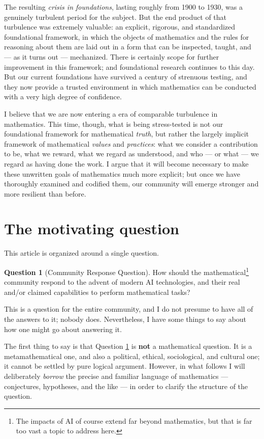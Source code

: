 \documentclass[12pt]{amsart}
\theoremstyle{definition}
\newtheorem{question}{Question}[section]
\begin{document}
The resulting \emph{crisis in foundations}, lasting roughly from 1900 to 1930, was a genuinely turbulent period for the subject.  But the end product of that turbulence was extremely valuable: an explicit, rigorous, and standardized foundational framework, in which the objects of mathematics and the rules for reasoning about them are laid out in a form that can be inspected, taught, and --- as it turns out --- mechanized.  There is certainly scope for further improvement in this framework; and foundational research continues to this day.  But our current foundations have survived a century of strenuous testing, and they now provide a trusted environment in which mathematics can be conducted with a very high degree of confidence.

I believe that we are now entering a era of comparable turbulence in mathematics.  This time, though, what is being stress-tested is not our foundational framework for mathematical \emph{truth}, but rather the largely implicit framework of mathematical \emph{values} and \emph{practices}: what we consider a contribution to be, what we reward, what we regard as understood, and who --- or what --- we regard as having done the work.  I argue that it will become necessary to make these unwritten goals of mathematics much more explicit; but once we have thoroughly examined and codified them, our community will emerge stronger and more resilient than before.

\section{The motivating question}

This article is organized around a single question.

\begin{question}[Community Response Question]\label{crq} How should the mathematical\footnote{The impacts of AI of course extend far beyond mathematics, but that is far too vast a topic to address here.} community respond to the advent of modern AI technologies, and their real and/or claimed capabilities to perform mathematical tasks?
\end{question}

This is a question for the entire community, and I do not presume to have all of the answers to it; nobody does.  Nevertheless, I have some things to say about how one might go about answering it.

The first thing to say is that Question \ref{crq} is \textbf{not} a mathematical question.  It is a metamathematical one, and also a political, ethical, sociological, and cultural one; it cannot be settled by pure logical argument.  However, in what follows I will deliberately \emph{borrow} the precise and familiar language of mathematics --- conjectures, hypotheses, and the like --- in order to clarify the structure of the question.
\end{document}
